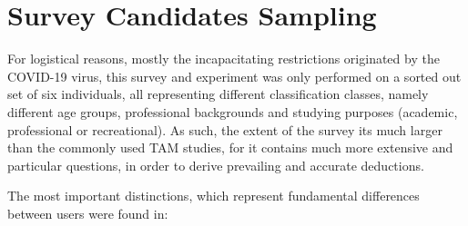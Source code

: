\section{Survey Candidates Sampling}
\label{section:sampling}
For logistical reasons, mostly the incapacitating restrictions 
originated by the COVID-19 virus, 
this survey and experiment was only performed on 
a sorted out set of six individuals, 
all representing different classification classes, namely different 
age groups, professional backgrounds and studying purposes 
(academic, professional or recreational).
As such, the extent of the survey its 
much larger than the commonly used TAM studies, 
for it contains much more extensive and 
particular questions, in order to derive prevailing 
and accurate deductions.

The most important distinctions, which represent fundamental 
differences between users
were found in:

